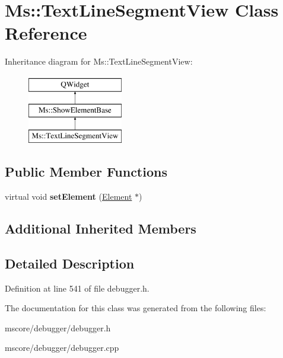 \hypertarget{class_ms_1_1_text_line_segment_view}{}\section{Ms\+:\+:Text\+Line\+Segment\+View Class Reference}
\label{class_ms_1_1_text_line_segment_view}
Inheritance diagram for Ms\+:\+:Text\+Line\+Segment\+View\+:\begin{figure}[H]
\begin{center}
\leavevmode
\includegraphics[height=3.000000cm]{class_ms_1_1_text_line_segment_view}
\end{center}
\end{figure}
\subsection*{Public Member Functions}
\begin{DoxyCompactItemize}
\item 
\mbox{\label{class_ms_1_1_text_line_segment_view_ac63df77ff81fcafe27636eb69158baa0}} 
virtual void {\bfseries set\+Element} (\hyperlink{class_ms_1_1_element}{Element} $\ast$)
\end{DoxyCompactItemize}
\subsection*{Additional Inherited Members}


\subsection{Detailed Description}


Definition at line 541 of file debugger.\+h.



The documentation for this class was generated from the following files\+:\begin{DoxyCompactItemize}
\item 
mscore/debugger/debugger.\+h\item 
mscore/debugger/debugger.\+cpp\end{DoxyCompactItemize}
